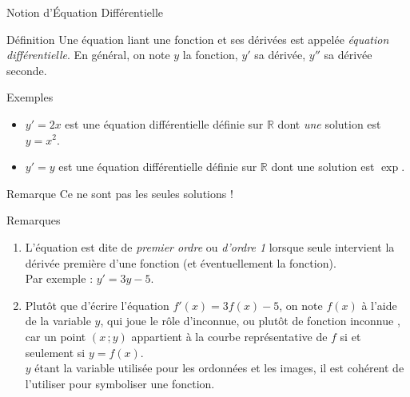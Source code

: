 \documentclass{coursbook}
\begin{document}
    \begin{Gpartie}{Notion d'Équation Différentielle} 
        \begin{Spartie}{Définition} 
            Une équation liant une fonction et ses dérivées est appelée \emph{équation différentielle}. En général, on note $y$ la fonction, $y'$ sa dérivée, $y''$ sa dérivée seconde.
        \end{Spartie}
        \begin{Spartie}{Exemples} 
            \begin{itemize}
                \item $y'=2x$ est une équation différentielle définie sur $\mathbb{R}$ dont \textit{une} solution est~$y=x^2$.
                \item $y'=y$ est une équation différentielle définie sur $\mathbb{R}$ dont une solution est $\exp$.
            \end{itemize}
            \begin{SSpartie}{Remarque} 
                Ce ne sont pas les seules solutions !
            \end{SSpartie}
        \end{Spartie}
        \begin{Spartie}{Remarques} 
            \begin{enumerate}[(1)]
                \item L'équation est dite de \emph{premier ordre} ou \emph{d'ordre 1} lorsque seule intervient la dérivée première d'une fonction (et éventuellement la fonction). \\ Par exemple : $y'=3y-5$.
                \item Plutôt que d'écrire l'équation $f'(x)=3f(x)-5$, on note $f(x)$ à l'aide de la variable $y$, qui joue le rôle d'inconnue, ou plutôt de \og fonction inconnue \fg{}, car un point $(x\,; y)$ appartient à la courbe représentative de $f$ si et seulement si $y=f(x)$. \\ $y$ étant la variable utilisée pour les ordonnées et les images, il est cohérent de l'utiliser pour symboliser une fonction.
            \end{enumerate}
        \end{Spartie}
    \end{Gpartie}
\end{document}
